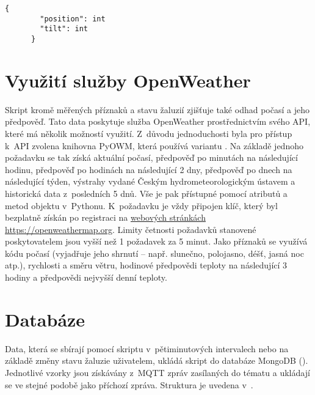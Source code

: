     \begin{lstlisting}[caption={[Struktura zprávy o~stavu žaluzie]Struktura zprávy o~stavu žaluzie, která je všem klientům zasílána každých 15~s. Klíč \code{position} označuje výšku vytažení žaluzie (0 -- zavřeno, 100 -- otevřeno), obdobně hodnota \code{tilt} vyjadřuje naklopení lamel.},captionpos=b,label=lst:wsMsg]
      {
        "position": int
        "tilt": int
      }
    \end{lstlisting}

  \section{Využití služby OpenWeather} \label{sec:owm}
    Skript  kromě měřených příznaků a stavu žaluzií zjišťuje také odhad počasí a jeho předpověď. Tato data poskytuje služba OpenWeather prostřednictvím svého API, které má několik možností využití. Z~důvodu jednoduchosti byla pro přístup k~API zvolena knihovna PyOWM, která používá variantu . Na základě jednoho požadavku se tak získá aktuální počasí, předpověď po minutách na následující hodinu, předpověď po hodinách na následující 2 dny, předpověď po dnech na následující týden, výstrahy vydané Českým hydrometeorologickým ústavem a historická data z~posledních 5 dnů. Vše je pak přístupné pomocí atributů a metod objektu v~Pythonu. K~požadavku je vždy připojen klíč, který byl bezplatně získán po registraci na \href{https://openweathermap.org}{webových stránkách https://openweathermap.org}. Limity četnosti požadavků stanovené poskytovatelem jsou vyšší než 1 požadavek za 5 minut. Jako příznaků se využívá kódu počasí (vyjadřuje jeho shrnutí -- např. slunečno, polojasno, déšť, jasná noc atp.), rychlosti a směru větru, hodinové předpovědi teploty na následující 3 hodiny a předpovědi nejvyšší denní teploty.

  \section{Databáze}\label{sec:db}
    Data, která se sbírají pomocí skriptu  v~pětiminutových intervalech nebo na základě změny stavu žaluzie uživatelem, ukládá skript  do databáze MongoDB (\cite{mongodb:mongodb}). Jednotlivé vzorky jsou získávány z~MQTT zpráv zasílaných do tématu  a ukládají se ve stejné podobě jako příchozí zpráva. Struktura je uvedena v~.

